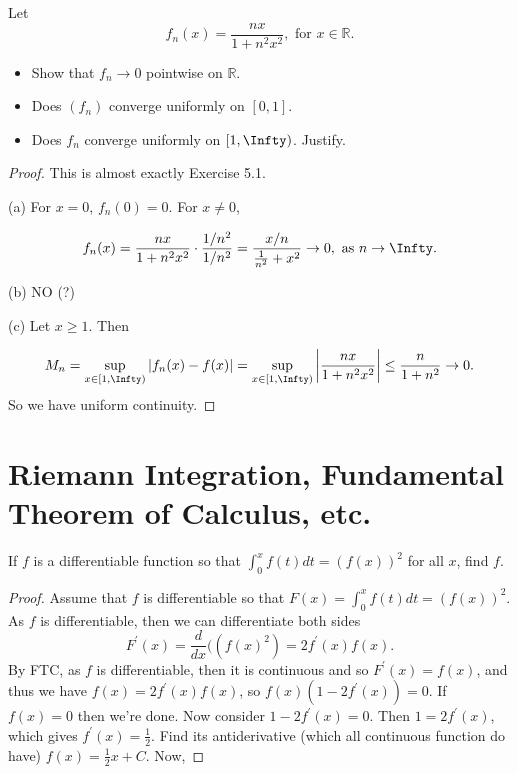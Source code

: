 \documentclass[oneside]{amsart}
\theoremstyle{definition}
\newcommand{\rr}{\mathbb R}
\newcommand{\pp}{\prime}
\begin{document}
\begin{tcolorbox}[colback=black!5!white,colframe=black!75!black,title= Exercise $5.5.$] Let $$f_n(x) = \frac{nx}{1+n^2x^2}, \text{ for } x \in \rr.$$
\begin{itemize}
	\item [(a)] Show that $f_n \to 0$ pointwise on $\rr$.
	\item [(b)] Does $(f_n)$ converge uniformly on $[0,1]$.
	\item [(c)] Does $f_n$ converge uniformly on $[1, \Infty)$. Justify.
\end{itemize}
\tcblower 
\begin{proof}  This is almost exactly Exercise 5.1.

(a)  For $x = 0$, $f_n (0) = 0$. For $x \neq 0$,  

\begin{align*}
	f_n(x) = \frac{nx}{1+n^2x^2} \cdot \frac{1/n^2}{1/n^2} = \frac{x/n}{\frac{1}{n^2}+{x^2}} \to 0, \text{ as } n \to \Infty.
\end{align*}

(b) NO (?)

(c) Let $x \geq 1$. Then 

\begin{align*}
	M_n = \sup _{x \in [1,\Infty)} |f_n(x) - f(x)| = \sup _{x \in [1, \Infty)} \left |\frac{nx}{1+n^2x^2} \right | \leq \frac{n}{1+n^2} \to 0.
\end{align*} So we have uniform continuity. 
\end{proof} 
\end{tcolorbox}



\newpage 
\section{Riemann Integration, Fundamental Theorem of
Calculus, etc.}
\begin{tcolorbox}[colback=black!5!white,colframe=black!75!black,title= Exercise $6.1.$]If $f$ is a differentiable function so that $\int_0^x f(t)dt = (f(x))^2$ for all $x$, find $f$.
\tcblower 
\begin{proof} Assume that $f$ is differentiable so that $F (x) = \int_0^x f(t) dt = (f(x))^2$. As $f$ is differentiable, then we can differentiate both sides
\[
F^\pp (x) = \frac{d}{dx} ((f(x)^2) = 2f^\pp (x)f(x).
\] By FTC, as $f$ is differentiable, then it is continuous and so $F^\pp (x) =f(x)$, and thus we have $f(x) = 2f^\pp (x) f(x)$, so $f(x)(1-2f^\pp (x))= 0$. If $f(x) = 0$ then we're done. Now consider $1 - 2f^\pp (x) = 0$. Then $1 = 2f^\pp (x) $, which gives $f^\pp (x) = \frac{1}{2}$. Find its antiderivative (which all continuous function do have) $f(x) = \frac{1}{2}x + C$. Now, 
\end{proof} 
\end{tcolorbox}
\end{document}
